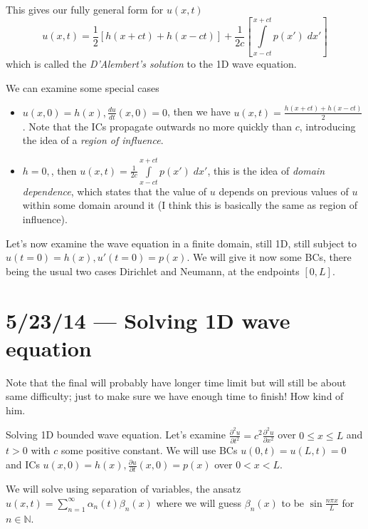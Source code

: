 \documentclass[10pt]{report}
\newcommand{\ptd}[2]{\frac{\partial^2 #1}{\partial#2^2}}
\newcommand{\rd}[2]{\frac{d#1}{d#2}}
\newcommand{\pd}[2]{\frac{\partial #1}{\partial#2}}
\begin{document}
This gives our fully general form for $u(x,t)$
\begin{equation}
    u(x,t) = \frac{1}{2}\left[ h(x  + ct) + h(x - ct) \right] + \frac{1}{2c}\left[ \int\limits_{x-ct}^{x+ct}p(x')\;dx' \right]
\end{equation}
which is called the \emph{D'Alembert's solution} to the 1D wave equation. 

We can examine some special cases
\begin{itemize}
    \item $u(x,0) = h(x), \rd{u}{t}(x,0) = 0$, then we have $u(x,t) = \frac{h(x + ct) + h(x-ct)}{2}$. Note that the ICs propagate outwards no more quickly than $c$, introducing the idea of a \emph{region of influence}. 
    \item $h = 0,$, then $u(x,t) = \frac{1}{2c}\int\limits_{x-ct}^{x+ct}p(x')\;dx'$, this is the idea of \emph{domain dependence}, which states that the value of $u$ depends on previous values of $u$ within some domain around it (I think this is basically the same as region of influence).  
\end{itemize}

Let's now examine the wave equation in a finite domain, still 1D, still subject to $u(t=0) = h(x), u'(t=0) = p(x)$. We will give it now some BCs, there being the usual two cases Dirichlet and Neumann, at the endpoints $[0,L]$. 
\chapter{5/23/14 --- Solving 1D wave equation}

Note that the final will probably have longer time limit but will still be about same difficulty; just to make sure we have enough time to finish! How kind of him.

Solving 1D bounded wave equation. Let's examine $\ptd{u}{t} = c^2 \ptd{u}{x}$ over $0 \leq x \leq L$ and $t > 0$ with $c$ some positive constant. We will use BCs $u(0,t) = u(L,t) = 0$ and ICs $u(x,0) = h(x), \pd{u}{t}(x,0) = p(x)$ over $0 < x < L$.

We will solve using separation of variables, the ansatz $u(x,t) = \sum\limits_{n=1}^{\infty}\alpha_n(t) \beta_n(x)$ where we will guess $\beta_n(x)$ to be $\sin \frac{n\pi x}{L}$ for $n \in \mathbb{N}$. 
\end{document}
